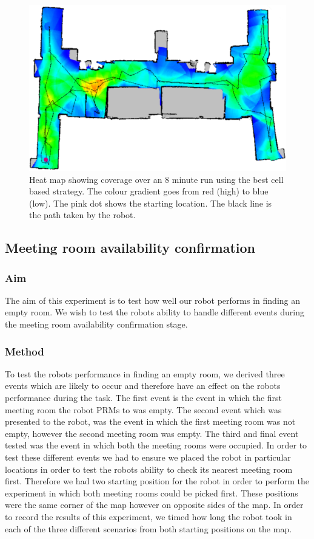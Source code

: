 \documentclass[conference]{IEEEtran}
\begin{document}
\begin{figure}
  \includegraphics[width=\columnwidth]{4-1_1}
  \caption{Heat map showing coverage over an 8 minute run using the best cell based strategy. The colour gradient goes from red (high) to blue (low). The pink dot shows the starting location. The black line is the path taken by the robot.}
  \label{fig:heatmap}
\end{figure}

\subsection{Meeting room availability confirmation}

\subsubsection{Aim}
The aim of this experiment is to test how well our robot performs in finding an empty room. We wish to test the robots ability to handle different events during the meeting room availability confirmation stage.
\subsubsection{Method}
To test the robots performance in finding an empty room, we derived three events which are likely to occur and therefore have an effect on the robots performance during the task. The first event is the event in which the first meeting room the robot PRMs to was empty. The second event which was presented to the robot, was the event in which the first meeting room was not empty, however the second meeting room was empty. The third and final event tested was the event in which both the meeting rooms were occupied. In order to test these different events we had to ensure we placed the robot in particular locations in order to test the robots ability to check its nearest meeting room first. Therefore we had two starting position for the robot in order to perform the experiment in which both meeting rooms could be picked first. These positions were the same corner of the map however on opposite sides of the map. In order to record the results of this experiment, we timed how long the robot took in each of the three different scenarios from both starting positions on the map.
\end{document}
